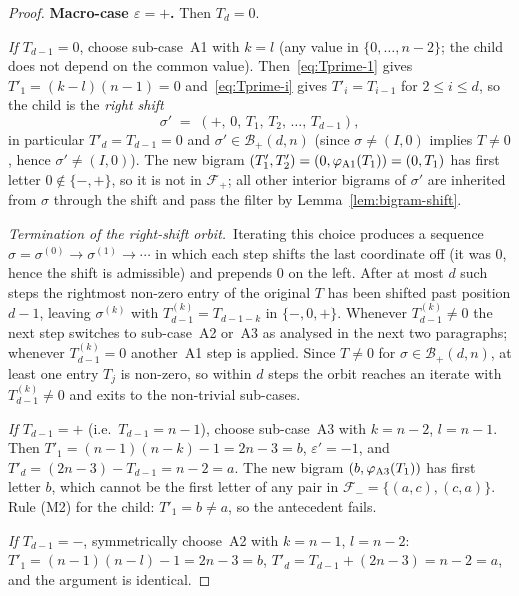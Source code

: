 \documentclass{amsart}
\theoremstyle{definition}
\theoremstyle{remark}
\begin{document}
\begin{proof}
\smallskip\noindent\textbf{Macro-case $\varepsilon = +$.}
Then $T_d = 0$.

\emph{If $T_{d-1} = 0$}, choose sub-case~\textup{A1} with $k = l$
\textup{(}any value in $\{0, \ldots, n-2\}$; the child does not
depend on the common value\textup{)}.  Then~\eqref{eq:Tprime-1}
gives $T'_1 = (k - l)(n - 1) = 0$ and~\eqref{eq:Tprime-i} gives
$T'_i = T_{i-1}$ for $2 \le i \le d$, so the child is the
\emph{right shift}
\[
  \sigma' \;=\; (+,\, 0,\, T_1,\, T_2,\, \ldots,\, T_{d-1}),
\]
in particular $T'_d = T_{d-1} = 0$ and
$\sigma' \in \mathcal{B}_+(d, n)$ (since $\sigma \neq (I, 0)$
implies $T \neq 0$, hence $\sigma' \neq (I, 0)$).  The new bigram
$(T'_1, T'_2) = (0, \varphi_{\textup{A1}}(T_1)) = (0, T_1)$ has
first letter $0 \notin \{-, +\}$, so it is not in $\mathcal{F}_+$;
all other interior bigrams of $\sigma'$ are inherited from $\sigma$
through the shift and pass the filter by
Lemma~\ref{lem:bigram-shift}.

\emph{Termination of the right-shift orbit.}\ Iterating this choice
produces a sequence $\sigma = \sigma^{(0)} \to \sigma^{(1)} \to
\cdots$ in which each step shifts the last coordinate off (it was
$0$, hence the shift is admissible) and prepends $0$ on the left.
After at most $d$ such steps the rightmost non-zero entry of the
original $T$ has been shifted past position $d-1$, leaving
$\sigma^{(k)}$ with $T^{(k)}_{d-1} = T_{d-1-k}$ in $\{-, 0, +\}$.
Whenever $T^{(k)}_{d-1} \neq 0$ the next step switches to
sub-case~\textup{A2} or~\textup{A3} as analysed in the next two
paragraphs; whenever $T^{(k)}_{d-1} = 0$ another~\textup{A1} step
is applied.  Since $T \neq 0$ for $\sigma \in \mathcal{B}_+(d, n)$,
at least one entry $T_j$ is non-zero, so within $d$ steps the
orbit reaches an iterate with $T^{(k)}_{d-1} \neq 0$ and exits to
the non-trivial sub-cases.

\emph{If $T_{d-1} = +$} \textup{(}i.e.\ $T_{d-1} = n - 1$\textup{)},
choose sub-case~\textup{A3} with $k = n - 2$, $l = n - 1$.  Then
$T'_1 = (n-1)(n-k) - 1 = 2n - 3 = b$, $\varepsilon' = -1$, and
$T'_d = (2n - 3) - T_{d-1} = n - 2 = a$.  The new bigram
$(b, \varphi_{\textup{A3}}(T_1))$ has first letter $b$, which
cannot be the first letter of any pair in $\mathcal{F}_- =
\{(a, c), (c, a)\}$.  Rule \textup{(M2)} for the child: $T'_1 = b
\ne a$, so the antecedent fails.

\emph{If $T_{d-1} = -$}, symmetrically choose~\textup{A2} with
$k = n - 1$, $l = n - 2$: $T'_1 = (n-1)(n-l) - 1 = 2n - 3 = b$,
$T'_d = T_{d-1} + (2n - 3) = n - 2 = a$, and the argument is
identical.


\end{proof}
\end{document}
